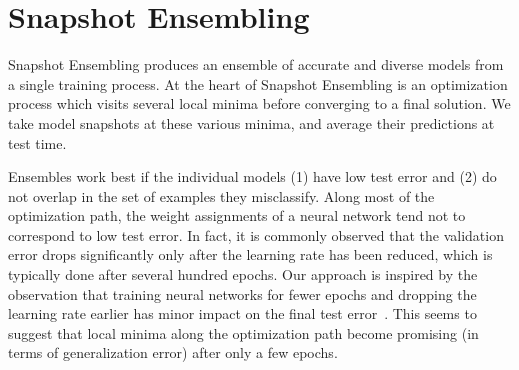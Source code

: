 \section{Snapshot Ensembling}
\label{sec:method}



%

Snapshot Ensembling produces an ensemble of accurate and diverse models from a single training process. At the heart of Snapshot Ensembling is an optimization process which visits several local minima before converging to a final solution. We take model snapshots at these various minima, and average their predictions at test time.

Ensembles work best if the individual models (1) have low test error and (2) do not overlap in the set of examples they misclassify.
Along most of the optimization path, the weight assignments of a neural network tend not to correspond to low test error.
In fact, it is commonly observed that the validation error drops significantly only after the learning rate has been reduced, which is typically done after several hundred epochs.
Our approach is inspired by the observation that training neural networks for fewer epochs and dropping the learning rate earlier has minor impact on the final test error~\citep{loshchilov2016sgdr}.
This seems to suggest that local minima along the optimization path become promising (in terms of generalization error) after only a few epochs.


